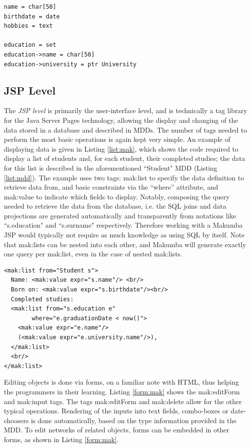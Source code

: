 \documentclass{llncs}
\begin{document}
\lstset{basicstyle=\small, captionpos=b, caption=Makumba Data Definition "Student", label=list:mdd, frame=shadowbox}
\begin{lstlisting}
name = char[50]
birthdate = date
hobbies = text

education = set
education->name = char[50]
education->university = ptr University
\end{lstlisting}

\subsection{JSP Level}
The \textit{JSP level} is primarily the user-interface level, and is technically a tag library for the Java Server Pages technology, allowing the display and changing of the data stored in a database and described in MDDs. The number of tags needed to perform the most basic operations is again kept very simple. An example of displaying data is given in Listing \ref{list:mak}, which shows the code required to display a list of students and, for each student, their completed studies; the data for this list is described in the aforementioned ``Student" MDD (Listing \ref{list:mdd}). The example uses two tags: mak:list to specify the data definition to retrieve data from, and basic constraints via the ``where'' attribute, and mak:value to indicate which fields to display. Notably, composing the query needed to retrieve the data from the database, i.e. the SQL joins and data projections are generated automatically and transparently from notations like ``s.education" and ``s.surname" respectively. Therefore working with a Makumba JSP would typically not require as much knowledge as using SQL by itself. Note that mak:lists can be nested into each other, and Makumba will generate exactly one query per mak:list, even in the case of nested mak:lists.

\lstset{basicstyle=\small, captionpos=b, caption=Example of viewing data with the Makumba JSP tag library, label=list:mak, frame=shadowbox}
\begin{lstlisting}
<mak:list from="Student s">
  Name: <mak:value expr="s.name"/> <br/>
  Born on: <mak:value expr="s.birthdate"/><br/>
  Completed studies:
  <mak:list from="s.education e"
  	    where="e.graduationDate < now()">
    <mak:value expr="e.name"/>
    (<mak:value expr="e.university.name"/>),
  </mak:list>
  <br/>
</mak:list>
\end{lstlisting}


Editing objects is done via forms, on a familiar note with HTML, thus helping the programmers in their learning.  Listing  \ref{form:mak} shows the mak:editForm and mak:input tags. The tags mak:editForm and mak:delete allow for the other typical operations. Rendering of the inputs into text fields, combo-boxes or date-choosers is done automatically, based on the type information provided in the MDD. To edit networks of related objects, forms can be embedded in other forms, as shown in Listing \ref{form:mak}.
\end{document}
